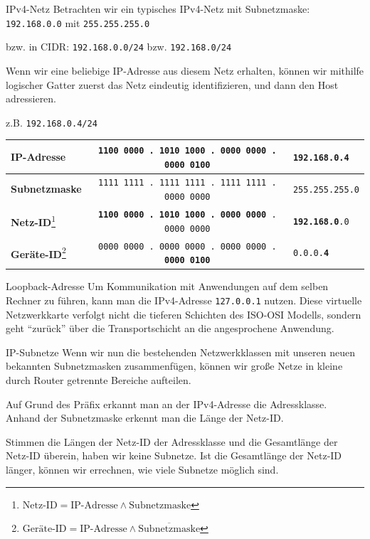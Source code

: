 \begin{example}{IPv4-Netz}
    Betrachten wir ein typisches IPv4-Netz mit Subnetzmaske:
    \texttt{192.168.0.0} mit \texttt{255.255.255.0}

    bzw. in CIDR:
    \texttt{192.168.0.0/24} bzw. \texttt{192.168.0/24}

    Wenn wir eine beliebige IP-Adresse aus diesem Netz erhalten, können wir mithilfe logischer Gatter zuerst das Netz eindeutig identifizieren, und dann den Host adressieren.

    z.B. \texttt{192.168.0.4/24}

    \begin{center}
        \begin{tabular}{|l|c|l|}
            \hline
            \textbf{IP-Adresse}                                                                                     & \texttt{1100 0000 . 1010 1000 . 0000 0000 . 0000 0100}          & \texttt{192.168.0.4}          \\\hline
            \textbf{Subnetzmaske}                                                                                   & \texttt{1111 1111 . 1111 1111 . 1111 1111 . 0000 0000}          & \texttt{255.255.255.0}        \\\hline
            \textbf{Netz-ID}\footnote{$\text{Netz-ID} = \text{IP-Adresse} \land \text{Subnetzmaske}$}               & \texttt{\textbf{1100 0000 . 1010 1000 . 0000 0000} . 0000 0000} & \texttt{\textbf{192.168.0}.0} \\\hline
            \textbf{Geräte-ID}\footnote{$\text{Geräte-ID} = \text{IP-Adresse} \land	\overline{\text{Subnetzmaske}}$} & \texttt{0000 0000 . 0000 0000 . 0000 0000 . \textbf{0000 0100}} & \texttt{0.0.0.\textbf{4}}     \\\hline
        \end{tabular}
    \end{center}
\end{example}

\begin{bonus}{Loopback-Adresse}
    Um Kommunikation mit Anwendungen auf dem selben Rechner zu führen, kann man die IPv4-Adresse \texttt{127.0.0.1} nutzen.
    Diese virtuelle Netzwerkkarte verfolgt nicht die tieferen Schichten des ISO-OSI Modells, sondern geht \enquote{zurück} über die Transportschicht an die angesprochene Anwendung.
\end{bonus}

\begin{defi}{IP-Subnetze}
    Wenn wir nun die bestehenden Netzwerkklassen mit unseren neuen bekannten Subnetzmasken zusammenfügen, können wir große Netze in kleine durch Router getrennte Bereiche aufteilen.

    Auf Grund des Präfix erkannt man an der IPv4-Adresse die Adressklasse.
    Anhand der Subnetzmaske erkennt man die Länge der Netz-ID.

    Stimmen die Längen der Netz-ID der Adressklasse und die Gesamtlänge der Netz-ID überein, haben wir keine Subnetze.
    Ist die Gesamtlänge der Netz-ID länger, können wir errechnen, wie viele Subnetze möglich sind.
\end{defi}

